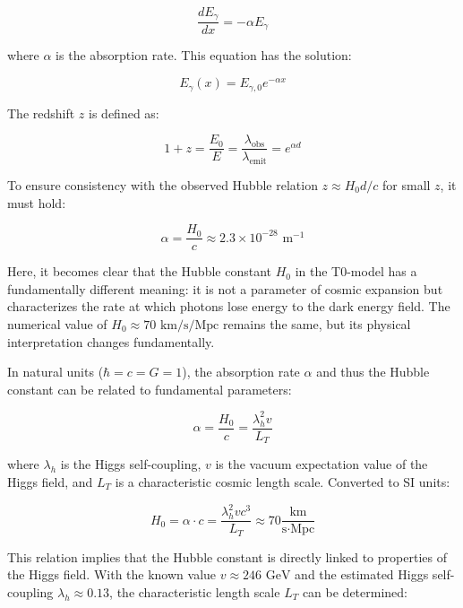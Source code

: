 \documentclass[a4paper,12pt]{article}
\theoremstyle{definition}
\theoremstyle{remark}
\begin{document}
	\begin{equation}
		\frac{dE_{\gamma}}{dx} = -\alpha E_{\gamma}
	\end{equation}
	
	where \(\alpha\) is the absorption rate. This equation has the solution:
	
	\begin{equation}
		E_{\gamma}(x) = E_{\gamma,0} e^{-\alpha x}
	\end{equation}
	
	The redshift \(z\) is defined as:
	
	\begin{equation}
		1 + z = \frac{E_0}{E} = \frac{\lambda_{\text{obs}}}{\lambda_{\text{emit}}} = e^{\alpha d}
	\end{equation}
	
	To ensure consistency with the observed Hubble relation \(z \approx H_0 d/c\) for small \(z\), it must hold:
	
	\begin{equation}
		\alpha = \frac{H_0}{c} \approx 2.3 \times 10^{-28} \text{ m}^{-1}
	\end{equation}
	
	Here, it becomes clear that the Hubble constant \(H_0\) in the T0-model has a fundamentally different meaning: it is not a parameter of cosmic expansion but characterizes the rate at which photons lose energy to the dark energy field. The numerical value of \(H_0 \approx 70 \text{ km/s/Mpc}\) remains the same, but its physical interpretation changes fundamentally.
	
	In natural units (\(\hbar = c = G = 1\)), the absorption rate \(\alpha\) and thus the Hubble constant can be related to fundamental parameters:
	
	\begin{equation}
		\alpha = \frac{H_0}{c} = \frac{\lambda_h^2 v}{L_T}
	\end{equation}
	
	where \(\lambda_h\) is the Higgs self-coupling, \(v\) is the vacuum expectation value of the Higgs field, and \(L_T\) is a characteristic cosmic length scale. Converted to SI units:
	
	\begin{equation}
		H_0 = \alpha \cdot c = \frac{\lambda_h^2 v c^3}{L_T} \approx 70 \frac{\text{km}}{\text{s} \cdot \text{Mpc}}
	\end{equation}
	
	This relation implies that the Hubble constant is directly linked to properties of the Higgs field. With the known value \(v \approx 246 \text{ GeV}\) and the estimated Higgs self-coupling \(\lambda_h \approx 0.13\), the characteristic length scale \(L_T\) can be determined:
	
\end{document}
